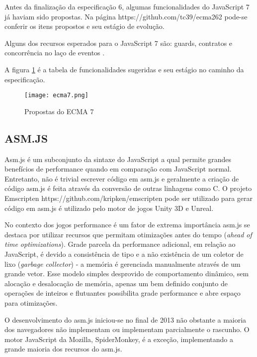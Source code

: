 Antes da finalização da especificação 6, algumas funcionalidades
do JavaScript 7 já haviam sido propostas. Na página
https://github.com/tc39/ecma262 pode-se conferir os itens propostos e
seu estágio de evolução.

Alguns dos recursos esperados para o JavaScript 7 são: guards, contratos
e concorrência no laço de eventos \autocite{ecma7}. 

A figura \ref{fig:ecma7} é a tabela de funcionalidades sugeridas e seu
estágio no caminho da especificação.

\begin{figure}
    \centering
    \texttt{[image: ecma7.png]}
	\caption{Propostas do ECMA 7}
    \label{fig:ecma7}
\end{figure}

\subsection{ASM.JS}%

Asm.js é um subconjunto da sintaxe do JavaScript a qual permite
grandes benefícios de performance quando em comparação com
JavaScript normal. Entretanto, não é trivial escrever código em
asm.js e geralmente a criação de código asm.js é feita através
da conversão de outras linhagens como C. O projeto Emscripten
https://github.com/kripken/emscripten pode ser utilizado para gerar
código em asm.js é utilizado pelo motor de jogos Unity 3D e Unreal.

No contexto dos jogos performance é um fator de extrema importância
asm.js se destaca por utilizar recursos que permitam otimizações
antes do tempo (\textit{ahead of time optimizations}). Grade parcela
da performance adicional, em relação ao JavaScript, é devido a
consistência de tipo e a não existência de um coletor de lixo
(\textit{garbage collector}) - a memória é gerenciada manualmente
através de um grande vetor. Esse modelo simples desprovido de
comportamento dinâmico, sem alocação e desalocação de memória,
apenas um bem definido conjunto de operações de inteiros e flutuantes
possibilita grade performance e abre espaço para otimizações.

O desenvolvimento do asm.js iniciou-se no final de 2013 não obstante a
maioria dos navegadores não implementam ou implementam parcialmente o
rascunho. O motor JavaScript da Mozilla, SpiderMonkey, é a exceção,
implementando a grande maioria dos recursos do asm.js.

